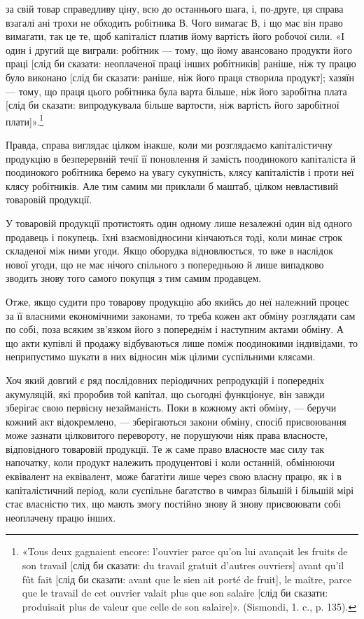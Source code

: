 \parcont{}  %
за свій товар справедливу ціну, всю до останнього шага, і, по-друге,
ця справа взагалі ані трохи не обходить робітника В. Чого вимагає
В, і що має він право вимагати, так це те, щоб капіталіст
платив йому вартість його робочої сили. «І один і другий ще
виграли: робітник — тому, що йому авансовано продукти його
праці [слід би сказати: неоплаченої праці інших робітників]
раніше, ніж ту працю було виконано [слід би сказати: раніше,
ніж його праця створила продукт]; хазяїн — тому, що праця
цього робітника була варта більше, ніж його заробітна плата
[слід би сказати: випродукувала більше вартости, ніж вартість
його заробітної плати]».\footnote*{
«Tous deux gagnaient encore: l'ouvrier parce qu’on lui avançait les
fruits de son travail [слід би сказати: du travail gratuit d’autres ouvriers]
avant qu’il fût fait [слід би сказати: avant que le sien ait porté de fruit],
le maître, parce que le travail de cet ouvrier valait plus que son salaire
[слід би сказати: produisait plus de valeur que celle de son salaire]».
(Sismondi, 1. c., p. 135).
}

Правда, справа виглядає цілком інакше, коли ми розглядаємо
капіталістичну продукцію в безперервній течії її поновлення
й замість поодинокого капіталіста й поодинокого робітника
беремо на увагу сукупність, клясу капіталістів і проти
неї клясу робітників. Але тим самим ми приклали б маштаб,
цілком невластивий товаровій продукції.

У товаровій продукції протистоять один одному лише незалежні
один від одного продавець і покупець. їхні взаємовідносини
кінчаються тоді, коли минає строк складеної між ними угоди.
Якщо оборудка відновлюється, то вже в наслідок нової угоди,
що не має нічого спільного з попередньою й лише випадково
зводить знову того самого покупця з тим самим продавцем.

Отже, якщо судити про товарову продукцію або якийсь до
неї належний процес за її власними економічними законами,
то треба кожен акт обміну розглядати сам по собі, поза всяким
зв’язком його з попереднім і наступним актами обміну. А що акти
купівлі й продажу відбуваються лише поміж поодинокими індивідами,
то неприпустимо шукати в них відносин між цілими
суспільними клясами.

Хоч який довгий є ряд послідовних періодичних репродукцій
і попередніх акумуляцій, які проробив той капітал, що сьогодні
функціонує, він завжди зберігає свою первісну незайманість.
Поки в кожному акті обміну, — беручи кожний акт відокремлено, —
зберігаються закони обміну, спосіб присвоювання може зазнати
цілковитого перевороту, не порушуючи ніяк права власносте,
відповідного товаровій продукції. Те ж саме право власносте
має силу так напочатку, коли продукт належить продуцентові
і коли останній, обмінюючи еквівалент на еквівалент, може багатіти
лише через свою власну працю, як і в капіталістичний період,
коли суспільне багатство в чимраз більшій і більшій мірі
стає власністю тих, що мають змогу постійно знову й знову присвоювати
собі неоплачену працю інших.
